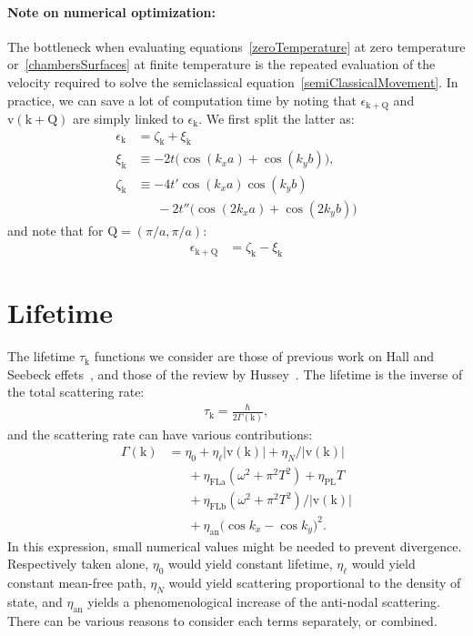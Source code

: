 \documentclass[notitlepage,11pt,nofootinbib]{revtex4-1}
\renewcommand{\vec}[1]{\bm{\mathrm{#1}}}
\begin{document}
\paragraph*{Note on numerical optimization:}
The bottleneck when evaluating equations~\eqref{zeroTemperature} at zero temperature or~\eqref{chambersSurfaces} at finite temperature is the repeated evaluation of the velocity required to solve the semiclassical equation~\eqref{semiClassicalMovement}. In practice, we can save a lot of computation time by noting that $\epsilon_{\vec k+\vec Q}$ and $\vec v(\vec k+\vec Q)$ are simply linked to $\epsilon_{\vec k}$. We first split the latter as:
\begin{align}
\epsilon_{\vec k} &= \zeta_{\vec k} + \xi_{\vec k}
\\
\xi_{\vec k}
&\equiv
-2t\big(\cos (k_xa) + \cos (k_yb)\big),
\\
\zeta_{\vec k} 
&\equiv
-4t'\cos (k_xa)\cos (k_yb)
\nonumber \\
&\phantom{=\ }
-2t''\big(\cos (2k_xa)+\cos (2k_yb)\big)
\end{align}
and note that for $\vec Q=(\pi/a,\pi/a)$:
\begin{align}
\epsilon_{\vec k+\vec Q} &= \zeta_{\vec k} - \xi_{\vec k}
\end{align}

\section{Lifetime}\label{section_lifetime}

The lifetime $\tau_{\vec k}$ functions we consider are those of previous work on Hall and Seebeck effets~\cite{verret_phenomenological_2017}, and those of the review by Hussey~\cite{hussey_phenomenology_2008}. The lifetime is the inverse of the total scattering rate:
\begin{align}
\tau_{\vec k}=\frac{\hbar}{2\Gamma(\vec k)},
\end{align}
and the scattering rate can have various contributions:
\begin{align}
\Gamma(\vec k) 
&=\eta_0
+ \eta_{\ell}|\vec v(\vec k)|
+ \eta_{N}/|\vec v(\vec k)|
\nonumber\\&
\phantom{=\ }
+ \eta_{\text{FLa}}(\omega^2 + \pi^2T^2)
+ \eta_{\text{PL}}T
\nonumber\\&
\phantom{=\ }
+ \eta_{\text{FLb}}(\omega^2 + \pi^2T^2)/|\vec v(\vec k)|
\nonumber\\&
\phantom{=\ }
+ \eta_{\text{an}}\big(\cos k_x - \cos k_y\big)^2.
\end{align}
In this expression, small numerical values might be needed to prevent divergence. Respectively taken alone, $\eta_0$ would yield constant lifetime, $\eta_\ell$ would yield constant mean-free path, $\eta_N$ would yield scattering proportional to the density of state, and $\eta_{\text{an}}$ yields a phenomenological increase of the anti-nodal scattering. There can be various reasons to consider each terms separately, or combined.
\end{document}
